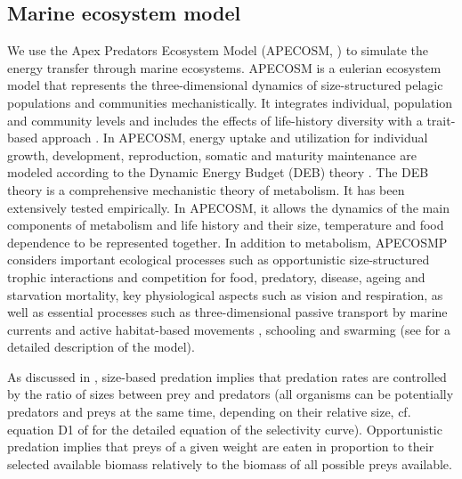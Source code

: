 
\subsection{Marine ecosystem model}
\label{sec:apecosm}

We use the Apex Predators Ecosystem Model (APECOSM, \citealp{mauryModelingEnvironmentalEffects2007, mauryOverviewAPECOSMSpatialized2010}) to simulate the energy transfer through marine ecosystems. 
APECOSM is a eulerian ecosystem model that represents the three-dimensional dynamics of size-structured pelagic populations and communities mechanistically. It integrates individual, population and community levels and includes the effects of life-history diversity with a trait-based approach \citep{mauryIndividualsPopulationsCommunities2013}. In APECOSM, energy uptake and utilization for individual growth, development, reproduction, somatic and maturity maintenance are modeled according to the Dynamic Energy Budget (DEB) theory \citep{koojmanDynamicEnergyBudget2010}. The DEB theory is a comprehensive mechanistic theory of metabolism. It has been extensively tested empirically. In APECOSM, it allows the dynamics of the main components of metabolism and life history and their size, temperature and food dependence to be represented together. In addition to metabolism, APECOSMP considers important ecological processes such as opportunistic size-structured trophic interactions and competition for food, predatory, disease, ageing and starvation mortality, key physiological aspects such as vision and respiration, as well as essential processes such as three-dimensional passive transport by marine currents and active habitat-based movements \citep{faugerasAdvectiondiffusionreactionSizestructuredFish2005}, schooling and swarming (see \citealp{mauryModelingEnvironmentalEffects2007, mauryIndividualsPopulationsCommunities2013, mauryCanSchoolingRegulate2017} for a detailed description of the model). 

As discussed in \cite{mauryIndividualsPopulationsCommunities2013}, size-based predation implies that predation rates are controlled by the ratio of sizes
between prey and predators (all organisms can be potentially predators and
preys at the same time, depending on their relative size, cf. equation D1 of \cite{mauryIndividualsPopulationsCommunities2013} for the detailed equation of the selectivity curve). Opportunistic predation implies that preys
of a given weight are eaten in proportion to their selected
available biomass relatively to the biomass of all possible preys
available.

